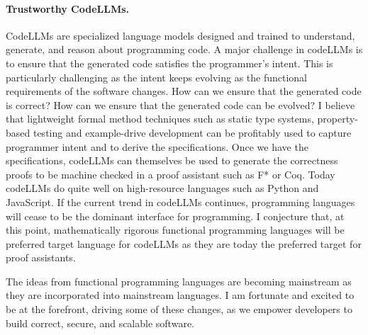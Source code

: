 \documentclass[screen,acmsmall,nonacm]{acmart}
\begin{document}
\paragraph{\bf Trustworthy CodeLLMs.} CodeLLMs are specialized language models
designed and trained to understand, generate, and reason about programming
code. A major challenge in codeLLMs is to ensure that the generated code
satisfies the programmer's intent. This is particularly challenging as the
intent keeps evolving as the functional requirements of the software changes.
How can we ensure that the generated code is correct? How can we ensure that
the generated code can be evolved? I believe that lightweight formal method
techniques such as static type systems, property-based testing and
example-drive development can be profitably used to capture programmer intent
and to derive the specifications. Once we have the specifications, codeLLMs can
themselves be used to generate the correctness proofs to be machine checked in
a proof assistant such as F* or Coq. Today codeLLMs do quite well on
high-resource languages such as Python and JavaScript. If the current trend in
codeLLMs continues, programming languages will cease to be the dominant
interface for programming. I conjecture that, at this point, mathematically
rigorous functional programming languages will be preferred target language for
codeLLMs as they are today the preferred target for proof assistants.

The ideas from functional programming languages are becoming mainstream as they
are incorporated into mainstream languages. I am fortunate and excited to be at
the forefront, driving some of these changes, as we empower developers to build
correct, secure, and scalable software.

\newpage



\end{document}
